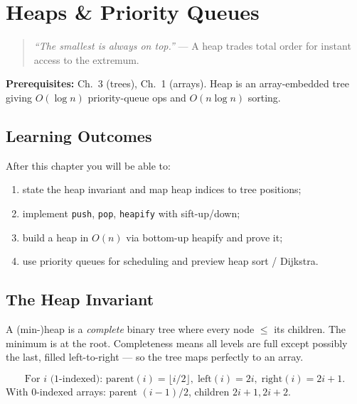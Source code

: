 \chapter{Heaps \& Priority Queues}
\label{ch:heaps-priority}

\begin{quote}
\emph{``The smallest is always on top.''} --- A heap trades total order for instant access to the extremum.
\end{quote}

\noindent\textbf{Prerequisites:} Ch.~3 (trees), Ch.~1 (arrays). Heap is an array-embedded tree giving $O(\log n)$ priority-queue ops and $O(n\log n)$ sorting.

\section*{Learning Outcomes}
After this chapter you will be able to:
\begin{enumerate}[label=(L\arabic*)]
    \item state the heap invariant and map heap indices to tree positions;
    \item implement \texttt{push}, \texttt{pop}, \texttt{heapify} with sift-up/down;
    \item build a heap in $O(n)$ via bottom-up heapify and prove it;
    \item use priority queues for scheduling and preview heap sort / Dijkstra.
\end{enumerate}

\section{The Heap Invariant}
\label{sec:heap-invariant}
A (min-)heap is a \emph{complete} binary tree where every node $\le$ its children. The minimum is at the root. Completeness means all levels are full except possibly the last, filled left-to-right --- so the tree maps perfectly to an array.

\begin{equation}
\text{For } i \text{ (1-indexed): } \text{parent}(i)=\lfloor i/2\rfloor,\;
\text{left}(i)=2i,\; \text{right}(i)=2i+1.
\label{eq:heap-index}
\end{equation}
With 0-indexed arrays: parent $(i-1)/2$, children $2i+1,2i+2$.

